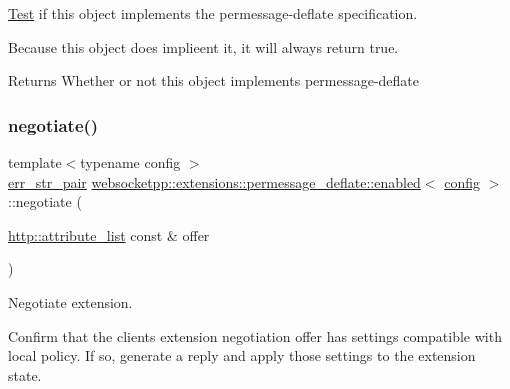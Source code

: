 \mbox{\hyperlink{struct_test}{Test}} if this object implements the permessage-\/deflate specification. 

Because this object does implieent it, it will always return true.

\begin{DoxyReturn}{Returns}
Whether or not this object implements permessage-\/deflate 
\end{DoxyReturn}
\mbox{\label{classwebsocketpp_1_1extensions_1_1permessage__deflate_1_1enabled_aa05eda4f6a0231c13708445480181ff4}} 
\subsubsection{\texorpdfstring{negotiate()}{negotiate()}}
{\footnotesize\ttfamily template$<$typename config $>$ \\
\mbox{\hyperlink{namespacewebsocketpp_abecf95d53c9387716b157daae84441f3}{err\+\_\+str\+\_\+pair}} \mbox{\hyperlink{classwebsocketpp_1_1extensions_1_1permessage__deflate_1_1enabled}{websocketpp\+::extensions\+::permessage\+\_\+deflate\+::enabled}}$<$ \mbox{\hyperlink{classconfig}{config}} $>$\+::negotiate (\begin{DoxyParamCaption}\item[{\mbox{\hyperlink{namespacewebsocketpp_1_1http_a9744f4104772b987aa9e86c35ce1357b}{http\+::attribute\+\_\+list}} const \&}]{offer }\end{DoxyParamCaption})\hspace{0.3cm}{\ttfamily [inline]}}



Negotiate extension. 

Confirm that the client\textquotesingle{}s extension negotiation offer has settings compatible with local policy. If so, generate a reply and apply those settings to the extension state.


